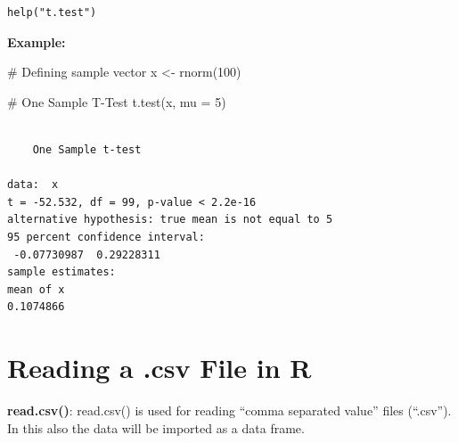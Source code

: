 \documentclass[
  letterpaper,
  DIV=11,
  numbers=noendperiod]{scrreprt}
\newenvironment{Shaded}{\begin{snugshade}}{\end{snugshade}}
\newcommand{\AttributeTok}[1]{\textcolor[rgb]{0.40,0.45,0.13}{#1}}
\newcommand{\CommentTok}[1]{\textcolor[rgb]{0.37,0.37,0.37}{#1}}
\newcommand{\DecValTok}[1]{\textcolor[rgb]{0.68,0.00,0.00}{#1}}
\newcommand{\FunctionTok}[1]{\textcolor[rgb]{0.28,0.35,0.67}{#1}}
\newcommand{\NormalTok}[1]{\textcolor[rgb]{0.00,0.23,0.31}{#1}}
\newcommand{\OtherTok}[1]{\textcolor[rgb]{0.00,0.23,0.31}{#1}}
\begin{document}
\begin{verbatim}
help("t.test")
\end{verbatim}

\textbf{Example:}~

\begin{Shaded}
\begin{Highlighting}[]
\CommentTok{\# Defining sample vector}
\NormalTok{x }\OtherTok{\textless{}{-}} \FunctionTok{rnorm}\NormalTok{(}\DecValTok{100}\NormalTok{)}

\CommentTok{\# One Sample T{-}Test}
\FunctionTok{t.test}\NormalTok{(x, }\AttributeTok{mu =} \DecValTok{5}\NormalTok{)}
\end{Highlighting}
\end{Shaded}

\begin{verbatim}

    One Sample t-test

data:  x
t = -52.532, df = 99, p-value < 2.2e-16
alternative hypothesis: true mean is not equal to 5
95 percent confidence interval:
 -0.07730987  0.29228311
sample estimates:
mean of x 
0.1074866 
\end{verbatim}

\hypertarget{reading-a-.csv-file-in-r}{%
\section{Reading a .csv File in R}\label{reading-a-.csv-file-in-r}}

\textbf{read.csv()}: read.csv() is used for reading ``comma separated
value'' files (``.csv''). In this also the data will be imported as a
data frame.
\end{document}
